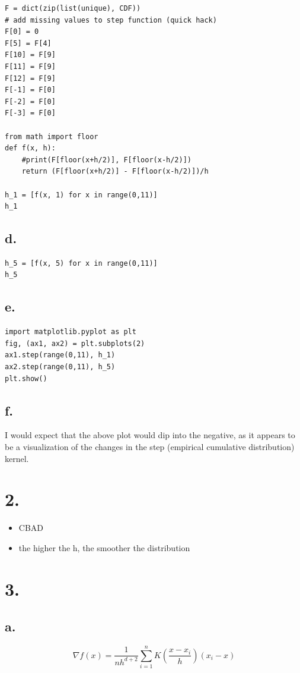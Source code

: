 \documentclass[11pt]{article}
\begin{document}
\begin{verbatim}
F = dict(zip(list(unique), CDF))
# add missing values to step function (quick hack)
F[0] = 0
F[5] = F[4]
F[10] = F[9]
F[11] = F[9]
F[12] = F[9]
F[-1] = F[0]
F[-2] = F[0]
F[-3] = F[0]

from math import floor
def f(x, h):
    #print(F[floor(x+h/2)], F[floor(x-h/2)])
    return (F[floor(x+h/2)] - F[floor(x-h/2)])/h

h_1 = [f(x, 1) for x in range(0,11)]
h_1
\end{verbatim}
\subsection*{d.}
\label{sec:orge5d883c}
\begin{verbatim}
h_5 = [f(x, 5) for x in range(0,11)]
h_5
\end{verbatim}
\subsection*{e.}
\label{sec:orga7503f3}
\begin{verbatim}
import matplotlib.pyplot as plt
fig, (ax1, ax2) = plt.subplots(2)
ax1.step(range(0,11), h_1)
ax2.step(range(0,11), h_5)
plt.show()
\end{verbatim}
\subsection*{f.}
\label{sec:orgd8a7293}
I would expect that the above plot would dip into the negative, as it appears to
be a visualization of the changes in the step (empirical cumulative
distribution) kernel.
\section*{2.}
\label{sec:org238ac5f}
\begin{itemize}
\item CBAD
\item the higher the h, the smoother the distribution
\end{itemize}
\section*{3.}
\label{sec:orga576ef4}
\subsection*{a.}
\label{sec:orgf44e737}
\begin{equation*}
\nabla f(x) = \frac{1}{nh^{d+2}}\sum \limits^n_{i=1}K\left(\frac{x-x_i}{h}\right)(x_i-x)
\end{equation*}
\end{document}
